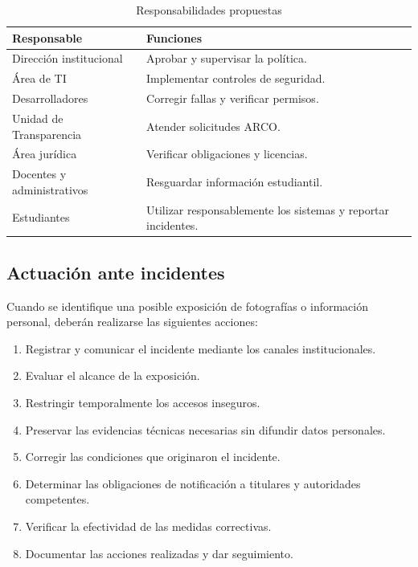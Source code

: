 \documentclass[12pt]{article}
\begin{document}
\begin{table}[H]
\centering
\caption{Responsabilidades propuestas}
\small
\begin{tabularx}{\textwidth}{|l|X|}
\hline
\textbf{Responsable} &
\textbf{Funciones} \\ \hline

Dirección institucional &
Aprobar y supervisar la política. \\ \hline

Área de TI &
Implementar controles de seguridad. \\ \hline

Desarrolladores &
Corregir fallas y verificar permisos. \\ \hline

Unidad de Transparencia &
Atender solicitudes ARCO. \\ \hline

Área jurídica &
Verificar obligaciones y licencias. \\ \hline

Docentes y administrativos &
Resguardar información estudiantil. \\ \hline

Estudiantes &
Utilizar responsablemente los sistemas
y reportar incidentes. \\ \hline

\end{tabularx}
\end{table}

\subsection{Actuación ante incidentes}

Cuando se identifique una posible
exposición de fotografías o
información personal, deberán
realizarse las siguientes acciones:

\begin{enumerate}
    \item Registrar y comunicar
    el incidente mediante los
    canales institucionales.

    \item Evaluar el alcance
    de la exposición.

    \item Restringir temporalmente
    los accesos inseguros.

    \item Preservar las evidencias
    técnicas necesarias sin
    difundir datos personales.

    \item Corregir las condiciones
    que originaron el incidente.

    \item Determinar las obligaciones
    de notificación a titulares
    y autoridades competentes.

    \item Verificar la efectividad
    de las medidas correctivas.

    \item Documentar las acciones
    realizadas y dar seguimiento.
\end{enumerate}
\end{document}
